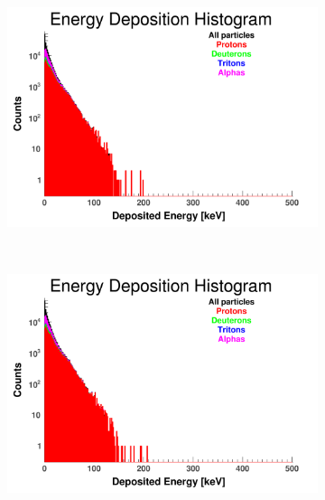 \documentclass[10pt,a4paper]{report}
\begin{document}
\begin{figure}[htbp]
    \begin{subfigure}[htbp]{0.42\textwidth}
        \label{fig:E5}
        \includegraphics[width=\textwidth]{./E5_QGSP_BIC_HP_Edep.png}
    \end{subfigure}
    ~ 
    \begin{subfigure}[htbp]{0.42\textwidth} 
        \label{fig:E6}
        \includegraphics[width=\textwidth]{./E6_QBBC_Edep.png}
    \end{subfigure}
    
    \vspace{1mm}
    

\end{figure}
\end{document}
